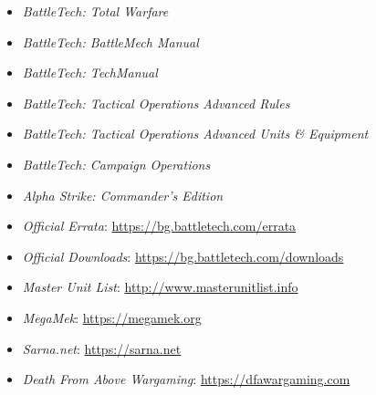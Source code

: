 \documentclass{article}
\begin{document}
\begin{itemize}

\item \emph{BattleTech: Total Warfare}

\item \emph{BattleTech: BattleMech Manual}

\item \emph{BattleTech: TechManual}

\item \emph{BattleTech: Tactical Operations Advanced Rules}

\item \emph{BattleTech: Tactical Operations Advanced Units \& Equipment}

\item \emph{BattleTech: Campaign Operations}

\item \emph{Alpha Strike: Commander's Edition}

\item \emph{Official Errata}: \href{https://bg.battletech.com/errata}{https://bg.battletech.com/errata}

\item \emph{Official Downloads}: \href{https://bg.battletech.com/downloads}{https://bg.battletech.com/downloads}

\item \emph{Master Unit List}: \href{http://www.masterunitlist.info}{http://www.masterunitlist.info}

\item \emph{MegaMek}: \href{https://megamek.org}{https://megamek.org}

\item \emph{Sarna.net}: \href{https://sarna.net}{https://sarna.net}

\item \emph{Death From Above Wargaming}: \href{https://dfawargaming.com}{https://dfawargaming.com}

\end{itemize}

\newpage


\clearpage
\end{document}
